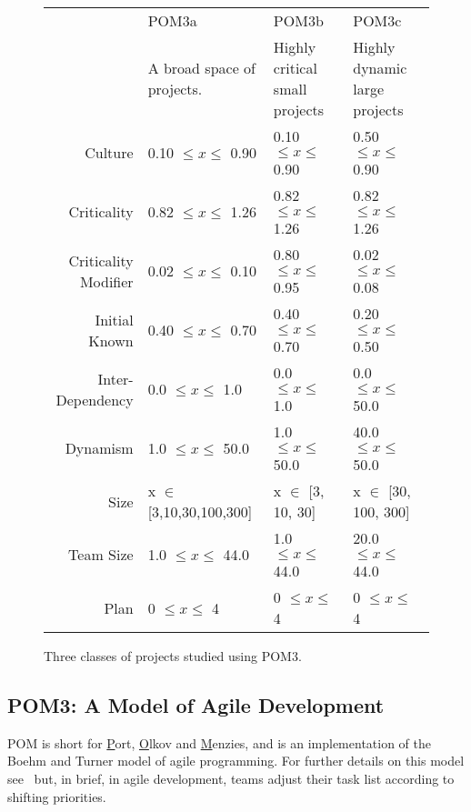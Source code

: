 \documentclass[10pt,journal,compsoc]{IEEEtran}
\begin{document}
\begin{figure*}%
\footnotesize
\begin{center}
    \begin{tabular}{r|p{1.5in}|p{1.5in}|p{1.5in}}
                     & POM3a                         & POM3b             &POM3c       \\ 
                             & A broad space of projects. & Highly critical small projects& Highly dynamic large projects\\\hline
        Culture              & 0.10 $\leq x \leq$ 0.90       & 0.10 $\leq x \leq$ 0.90  & 0.50 $\leq x \leq$ 0.90  \\ 
        Criticality          & 0.82 $\leq x \leq$ 1.26       & 0.82 $\leq x \leq$ 1.26   & 0.82 $\leq x \leq$ 1.26  \\ 
        Criticality Modifier & 0.02 $\leq x \leq$ 0.10       & 0.80 $\leq x \leq$ 0.95 & 0.02 $\leq x \leq$ 0.08   \\ 
        Initial Known        & 0.40 $\leq x \leq$ 0.70       & 0.40 $\leq x \leq$ 0.70  & 0.20 $\leq x \leq$ 0.50  \\ 
        Inter-Dependency     & 0.0   $\leq x \leq$ 1.0       & 0.0   $\leq x \leq$ 1.0  & 0.0   $\leq x \leq$ 50.0 \\ 
        Dynamism             & 1.0   $\leq x \leq$ 50.0      & 1.0   $\leq x \leq$ 50.0  & 40.0   $\leq x \leq$ 50.0 \\ 
        Size                 & x $\in$ [3,10,30,100,300] & x $\in$ [3, 10, 30]     & x $\in$ [30, 100, 300]   \\ 
        Team Size            & 1.0 $\leq x \leq$ 44.0        & 1.0 $\leq x \leq$ 44.0  & 20.0 $\leq x \leq$ 44.0    \\ 
        Plan                 & 0 $\leq x \leq$ 4             & 0 $\leq x \leq$ 4    & 0 $\leq x \leq$ 4       
\end{tabular}
\end{center}

\caption{Three classes of projects studied using POM3. }\label{fig:POM3abcd}
\end{figure*}




\subsection{POM3: A Model of Agile Development}\label{sec:pom3pom3}
POM is short for \underline{P}ort,
\underline{O}lkov and \underline{M}enzies, and is an
implementation of the Boehm and Turner model of
agile programming. For further
details on this model 
see~\cite{port08,1204376,turner03} but, in brief, in agile development, 
teams adjust
their task list according to shifting priorities.
\end{document}
